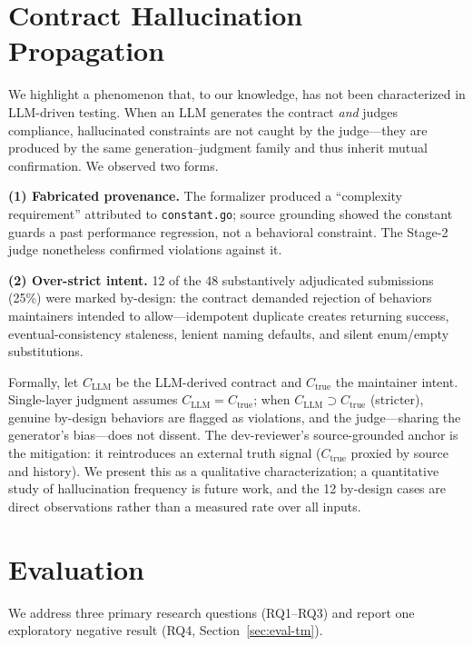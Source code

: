 \documentclass[sigconf]{acmart}
\begin{document}
\section{Contract Hallucination Propagation}\label{sec:hallucination}
We highlight a phenomenon that, to our knowledge, has not been characterized in LLM-driven testing. When an LLM generates the contract \emph{and} judges compliance, hallucinated constraints are not caught by the judge---they are produced by the same generation--judgment family and thus inherit mutual confirmation. We observed two forms.

\textbf{(1) Fabricated provenance.} The formalizer produced a ``complexity requirement'' attributed to \texttt{constant.go}; source grounding showed the constant guards a past performance regression, not a behavioral constraint. The Stage-2 judge nonetheless confirmed violations against it.

\textbf{(2) Over-strict intent.} 12 of the 48 substantively adjudicated submissions (25\%) were marked by-design: the contract demanded rejection of behaviors maintainers intended to allow---idempotent duplicate creates returning success, eventual-consistency staleness, lenient naming defaults, and silent enum/empty substitutions.

Formally, let $C_{\mathrm{LLM}}$ be the LLM-derived contract and $C_{\mathrm{true}}$ the maintainer intent. Single-layer judgment assumes $C_{\mathrm{LLM}} = C_{\mathrm{true}}$; when $C_{\mathrm{LLM}} \supset C_{\mathrm{true}}$ (stricter), genuine by-design behaviors are flagged as violations, and the judge---sharing the generator's bias---does not dissent. The dev-reviewer's source-grounded anchor is the mitigation: it reintroduces an external truth signal ($C_{\mathrm{true}}$ proxied by source and history). We present this as a qualitative characterization; a quantitative study of hallucination frequency is future work, and the 12 by-design cases are direct observations rather than a measured rate over all inputs.

\section{Evaluation}\label{sec:eval}

We address three primary research questions (RQ1--RQ3) and report one exploratory negative result (RQ4, Section~\ref{sec:eval-tm}).
\end{document}

